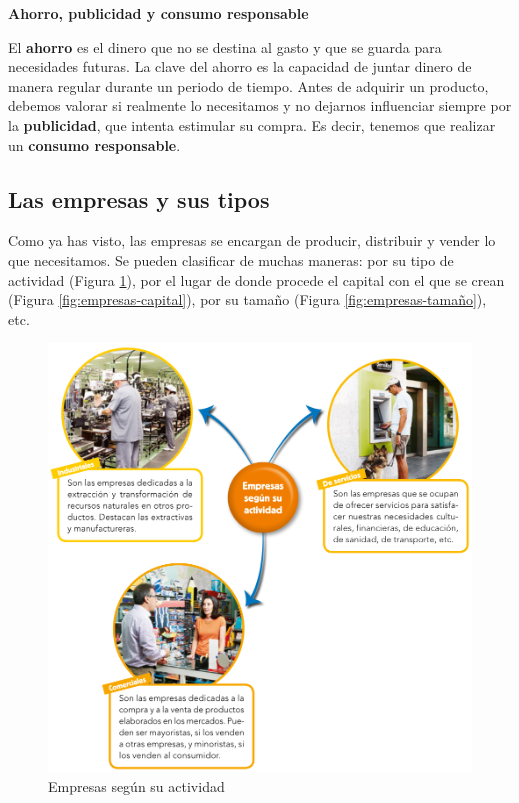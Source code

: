 \vspace{3mm}
\textbf{Ahorro, publicidad y consumo responsable}

\vspace{3mm}
El \textbf{ahorro} es el dinero que no se destina al gasto y que se guarda para necesidades futuras. La clave del ahorro es la capacidad de juntar dinero de manera regular durante un periodo de tiempo. Antes de adquirir un producto, debemos valorar si realmente lo necesitamos y no dejarnos influenciar siempre por la \textbf{publicidad}, que intenta estimular su compra. Es decir, tenemos que realizar un \textbf{consumo responsable}.

\subsection{Las empresas y sus tipos}

Como ya has visto, las empresas se encargan de producir, distribuir y vender lo que necesitamos. Se pueden clasificar de muchas maneras: por su tipo de actividad (Figura \ref{fig:empresas-actividad}), por el lugar de donde procede el capital con el que se crean (Figura \ref{fig:empresas-capital}), por su tamaño (Figura \ref{fig:empresas-tamaño}), etc.

\begin{figure}[!ht]
    \centering
    \includegraphics[width=0.8\linewidth]{Tema4/02_Empresas_actividad.png}
    \caption{Empresas según su actividad}
    \label{fig:empresas-actividad}
\end{figure}

